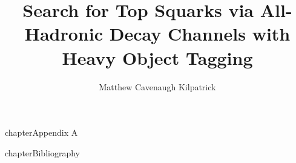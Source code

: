\documentclass[12pt]{ruthesis}
\title{Search for Top Squarks via All-Hadronic Decay Channels with Heavy Object Tagging}
\author{Matthew Cavenaugh Kilpatrick}
\begin{document}
  \begin{frontmatter}
   \makecover
   \maketitle
   
   \tableofcontents
   \listoffigures
   \listoftables
%   
  \end{frontmatter}











\appendix
{} {chapter}{\numberline {}Appendix A}


%
 {chapter}{\numberline {}Bibliography}{}



%

\end{document}
